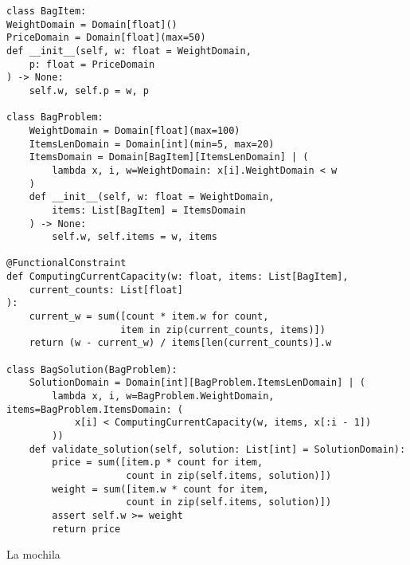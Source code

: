 \begin{listing}[!ht]
    \begin{verbatim}
class BagItem:
WeightDomain = Domain[float]()
PriceDomain = Domain[float](max=50)
def __init__(self, w: float = WeightDomain, 
    p: float = PriceDomain
) -> None:
    self.w, self.p = w, p

class BagProblem:
    WeightDomain = Domain[float](max=100)
    ItemsLenDomain = Domain[int](min=5, max=20)
    ItemsDomain = Domain[BagItem][ItemsLenDomain] | (
        lambda x, i, w=WeightDomain: x[i].WeightDomain < w
    )
    def __init__(self, w: float = WeightDomain, 
        items: List[BagItem] = ItemsDomain
    ) -> None:
        self.w, self.items = w, items
    
@FunctionalConstraint
def ComputingCurrentCapacity(w: float, items: List[BagItem], 
    current_counts: List[float]
):
    current_w = sum([count * item.w for count,
                    item in zip(current_counts, items)])
    return (w - current_w) / items[len(current_counts)].w

class BagSolution(BagProblem):
    SolutionDomain = Domain[int][BagProblem.ItemsLenDomain] | (
        lambda x, i, w=BagProblem.WeightDomain, items=BagProblem.ItemsDomain: (
            x[i] < ComputingCurrentCapacity(w, items, x[:i - 1])
        ))
    def validate_solution(self, solution: List[int] = SolutionDomain):
        price = sum([item.p * count for item,
                     count in zip(self.items, solution)])
        weight = sum([item.w * count for item,
                     count in zip(self.items, solution)])
        assert self.w >= weight
        return price

    \end{verbatim}
    \caption{La mochila}
    \label{lst:bag}
\end{listing}



